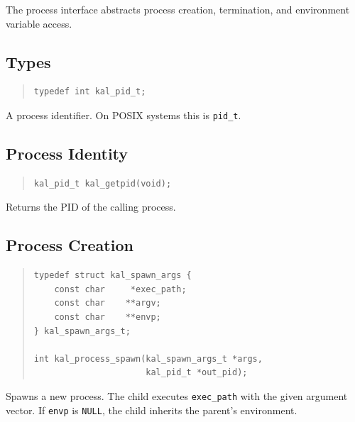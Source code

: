 \documentclass[11pt,twoside]{article}
\begin{document}
The process interface abstracts process creation, termination, and
environment variable access.

\subsection{Types}

\begin{quote}
\begin{verbatim}
typedef int kal_pid_t;
\end{verbatim}
\end{quote}

A process identifier.  On POSIX systems this is {\tt pid\_t}.

\subsection{Process Identity}

\begin{quote}
\begin{verbatim}
kal_pid_t kal_getpid(void);
\end{verbatim}
\end{quote}

Returns the PID of the calling process.

\subsection{Process Creation}

\begin{quote}
\begin{verbatim}
typedef struct kal_spawn_args {
    const char     *exec_path;
    const char    **argv;
    const char    **envp;
} kal_spawn_args_t;

int kal_process_spawn(kal_spawn_args_t *args,
                      kal_pid_t *out_pid);
\end{verbatim}
\end{quote}

Spawns a new process.  The child executes {\tt exec\_path} with the
given argument vector.  If {\tt envp} is {\tt NULL}, the child
inherits the parent's environment.
\end{document}
